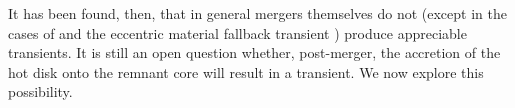 It has been found, then, that in general mergers themselves do not (except in the cases of \cite{pakm+10} and the eccentric material fallback transient \cite{loreig09}) produce appreciable transients.  It is still an open question whether, post-merger, the accretion of the hot disk onto the remnant core will result in a transient.  We now explore this possibility.